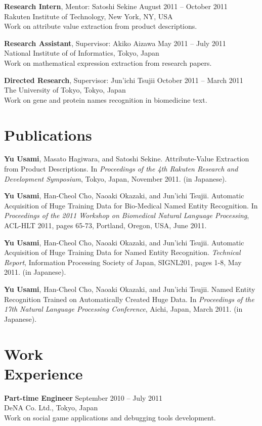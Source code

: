 \documentclass[margin]{res}
\begin{document}
\begin{resume}
\textbf{Research Intern}, Mentor: Satoshi Sekine \hfill August 2011 -- October 2011\\
Rakuten Institute of Technology, New York, NY, USA\\
Work on attribute value extraction from product descriptions. 

\textbf{Research Assistant}, Supervisor: Akiko Aizawa \hfill May 2011 -- July 2011\\
National Institute of of Informatics, Tokyo, Japan\\
Work on mathematical expression extraction from research papers.

\textbf{Directed Research}, Supervisor: Jun'ichi Tsujii \hfill October 2011 -- March 2011\\
The University of Tokyo, Tokyo, Japan\\
Work on gene and protein names recognition in biomedicine text.\\

\section{Publications}
\textbf{Yu Usami}, Masato Hagiwara, and Satoshi Sekine. Attribute-Value Extraction from Product Descriptions.
In \textit{Proceedings of the 4th Rakuten Research and Development Symposium}, Tokyo, Japan, November 2011. (in Japanese).

\textbf{Yu Usami}, Han-Cheol Cho, Naoaki Okazaki, and Jun'ichi Tsujii. Automatic Acquisition of Huge Training Data for Bio-Medical Named Entity Recognition. 
In \textit{Proceedings of the 2011 Workshop on Biomedical Natural Language Processing}, ACL-HLT 2011, pages 65-73, Portland, Oregon, USA, June 2011.

\textbf{Yu Usami}, Han-Cheol Cho, Naoaki Okazaki, and Jun'ichi Tsujii. Automatic Acquisition of Huge Training Data for Named Entity Recognition.
\textit{Technical Report}, Information Processing Society of Japan, SIGNL201, pages 1-8, May 2011. (in Japanese).

\textbf{Yu Usami}, Han-Cheol Cho, Naoaki Okazaki, and Jun'ichi Tsujii. Named Entity Recognition Trained on Automatically Created Huge Data.
In \textit{Proceedings of the 17th Natural Language Processing Conference}, Aichi, Japan, March 2011. (in Japanese).\\

\section{Work \\ Experience}
\textbf{Part-time Engineer} \hfill September 2010 -- July 2011\\
DeNA Co. Ltd., Tokyo, Japan\\
Work on social game applications and debugging tools development.


\end{resume}
\end{document}
